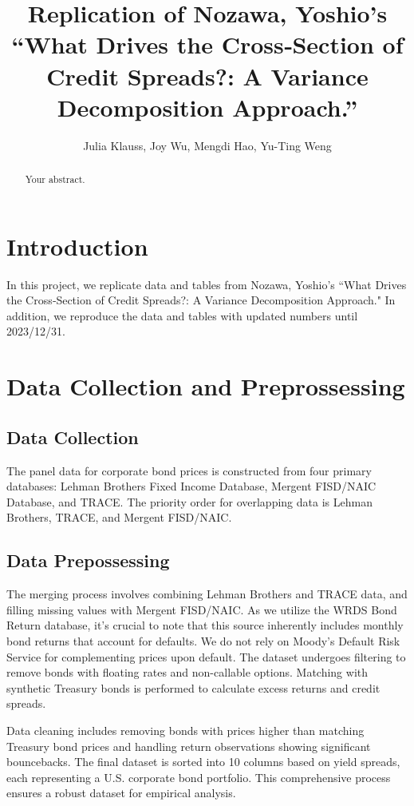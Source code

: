 \documentclass{article}
\title{Replication of Nozawa, Yoshio's “What Drives the Cross‐Section of Credit Spreads?: A Variance Decomposition Approach.”}
\author{Julia Klauss, Joy Wu, Mengdi Hao, Yu-Ting Weng}
\begin{document}
\maketitle

\begin{abstract}
Your abstract.
\end{abstract}

\section{Introduction}

In this project, we replicate data and tables from Nozawa, Yoshio's “What Drives the Cross‐Section of Credit Spreads?: A Variance Decomposition Approach." In addition, we reproduce the data and tables with updated numbers until 2023/12/31. 

\section{ Data Collection and Preprossessing}

\subsection{Data Collection}

The panel data for corporate bond prices is constructed from four primary databases: Lehman Brothers Fixed Income Database, Mergent FISD/NAIC Database, and TRACE. The priority order for overlapping data is Lehman Brothers, TRACE, and Mergent FISD/NAIC. 

\subsection{Data Prepossessing}

The merging process involves combining Lehman Brothers and TRACE data, and filling missing values with Mergent FISD/NAIC.  As we utilize the WRDS Bond Return database, it's crucial to note that this source inherently includes monthly bond returns that account for defaults. We do not rely on Moody's Default Risk Service for complementing prices upon default. The dataset undergoes filtering to remove bonds with floating rates and non-callable options. Matching with synthetic Treasury bonds is performed to calculate excess returns and credit spreads. 

Data cleaning includes removing bonds with prices higher than matching Treasury bond prices and handling return observations showing significant bouncebacks. The final dataset is sorted into 10 columns based on yield spreads, each representing a U.S. corporate bond portfolio. This comprehensive process ensures a robust dataset for empirical analysis. 
\end{document}
